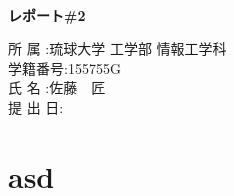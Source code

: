 \documentclass[9pt,fleqn]{jarticle} %
\begin{document}
\begin{titlepage}
    \begin{center} %
        \fontsize{25pt}{0pt}\selectfont %
        \vspace*{100truept}
        \bf{}\\ %
        \vspace*{10truept}
        \bf{レポート\#2}\\ 
        \vspace{240truept}
    \end{center}
    \begin{flushright}
        {\large
            \fontsize{16pt}{0pt}\selectfont
          所  属  :琉球大学 工学部 情報工学科\\
            \vspace{5truept}
          学籍番号:155755G\\
            \vspace{5truept}
          氏  名  :佐藤　匠\\
            \vspace{5truept}
          提 出 日:\\
            \vspace{5truept}
        }    
    \end{flushright}
\end{titlepage}

\tableofcontents{\tiny} %
\setcounter{page}{1} %
\pagestyle{plain}

\newpage

\section{asd}





\begin{thebibliography}{9} 
  \bibitem{} \url{}
\end{thebibliography}
\end{document}
